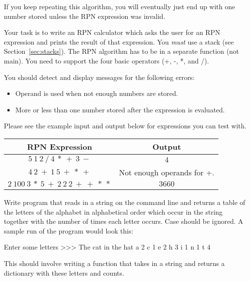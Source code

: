 \documentclass[11pt]{cselabheader}
\begin{document}
\begin{ex}
    If you keep repeating this algorithm, you will eventually just end up with
    one number stored unless the RPN expression was invalid.

    Your task is to write an RPN calculator which asks the user for an RPN
    expression and prints the result of that expression. You \emph{must} use a
    stack (see Section~\ref{sec:stacks}). The RPN algorithm has to be in a
    separate function (not main). You need to support the four basic operators
    (+, -, *, and /).

    You should detect and display messages for the following errors:
    \begin{itemize}
    \item Operand is used when not enough numbers are stored.
    \item More or less than one number stored after the expression is
      evaluated.
    \end{itemize}

    Please see the example input and output below for expressions you can test
    with.

    \begin{center}
    \begin{tabular}{cc}
      \toprule
      RPN Expression & Output\\
      \midrule
      $5~1~2~/~4~*~+~3~-$ & $4$\\
      $4~2~+~1~5~+~*~+$ & Not enough operands for +.\\
      $2~100~3~*~5~+~2~2~2~+~+~*~*$ & $3660$\\
      \bottomrule
    \end{tabular}
    \end{center}

  \end{ex}

\begin{ex}[lettercount.py]
Write program that reads in a string on the command line and returns a table of
the letters of the alphabet in alphabetical order which occur in the string
together with the number of times each letter occurs. Case should be ignored. A
sample run of the program would look this:

\begin{verbatimcode}
Enter some letters >>> The cat in the hat
a 2
c 1
e 2
h 3
i 1
n 1
t 4
\end{verbatimcode}

This should involve writing a function that takes in a string and returns a
dictionary with these letters and counts.
\end{ex}
\pagebreak
\end{document}

